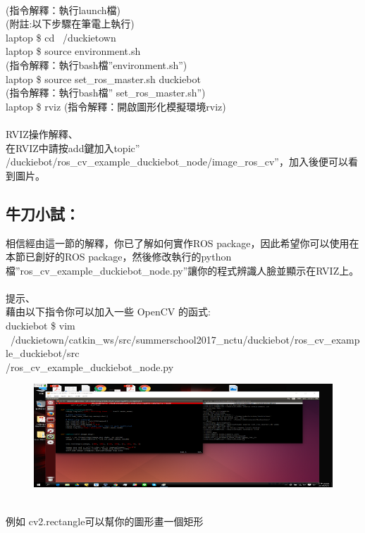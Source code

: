 \documentclass{article}
\begin{document}
\\(指令解釋：執行launch檔)
\\(附註:以下步驟在筆電上執行)
\\laptop \$ cd ~/duckietown
\\laptop \$ source environment.sh
\\(指令解釋：執行bash檔”environment.sh”)
\\laptop \$ source set\_ros\_master.sh duckiebot
\\(指令解釋：執行bash檔” set\_ros\_master.sh”)
\\laptop \$ rviz 
(指令解釋：開啟圖形化模擬環境rviz)
\\\\RVIZ操作解釋、
\\在RVIZ中請按add鍵加入topic” /duckiebot/ros\_cv\_example\_duckiebot\_node/image\_ros\_cv”，加入後便可以看到圖片。
\subsection{牛刀小試：}
相信經由這一節的解釋，你已了解如何實作ROS package，因此希望你可以使用在本節已創好的ROS package，然後修改執行的python檔”ros\_cv\_example\_duckiebot\_node.py”讓你的程式辨識人臉並顯示在RVIZ上。
\\\\提示、
\\藉由以下指令你可以加入一些 OpenCV 的函式:
\\duckiebot \$ vim ~/duckietown/catkin\_ws/src/summerschool2017\_nctu/duckiebot/ros\_cv\_example\_duckiebot/src\\/ros\_cv\_example\_duckiebot\_node.py
\begin{figure}[htp]
    \begin{center}
        \includegraphics[width=400pt]{pic/5_2_10.png}
    \end{center}
\end{figure}
\\
例如 cv2.rectangle可以幫你的圖形畫一個矩形

\newpage
\end{document}

